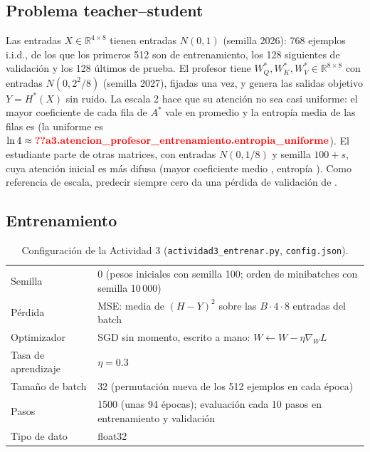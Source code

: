 \documentclass[10pt]{article}
\newcommand{\R}{\mathbb{R}}
\begin{document}
\subsection{Problema teacher--student}
Las entradas $X\in\R^{4\times8}$ tienen entradas $N(0,1)$ (semilla 2026): 768 ejemplos i.i.d., de los
que los primeros 512 son de entrenamiento, los 128 siguientes de validación y los 128 últimos de
prueba. El profesor tiene $W_Q^*, W_K^*, W_V^*\in\R^{8\times8}$ con entradas $N(0, 2^2/8)$ (semilla
2027), fijadas una vez, y genera las salidas objetivo $Y = H^*(X)$ sin ruido. La escala 2 hace que su
atención no sea casi uniforme: el mayor coeficiente de cada fila de $A^*$ vale en promedio
 y la entropía media de las filas es
 (la uniforme es
$\ln4\approx\V{a3.atencion_profesor_entrenamiento.entropia_uniforme}$). El estudiante parte de otras
matrices, con entradas $N(0,1/8)$ y semilla $100+s$, cuya atención inicial es más difusa (mayor
coeficiente medio , entropía
). Como referencia de escala, predecir
siempre cero da una pérdida de validación de .

\subsection{Entrenamiento}
\begin{table}[H]
  \centering\small
  \caption{Configuración de la Actividad 3 (\texttt{actividad3\_entrenar.py}, \texttt{config.json}).}
  \label{tab:config3}
  \begin{tabular}{ll}
    \toprule
    Semilla & 0 (pesos iniciales con semilla 100; orden de minibatches con semilla 10\,000) \\
    Pérdida & MSE: media de $(H-Y)^2$ sobre las $B\cdot4\cdot8$ entradas del batch \\
    Optimizador & SGD sin momento, escrito a mano: $W\leftarrow W-\eta\nabla_W L$ \\
    Tasa de aprendizaje & $\eta = \num{0.3}$ \\
    Tamaño de batch & 32 (permutación nueva de los 512 ejemplos en cada época) \\
    Pasos & 1500 (unas 94 épocas); evaluación cada 10 pasos en entrenamiento y validación \\
    Tipo de dato & float32 \\
    \bottomrule
  \end{tabular}
\end{table}
\end{document}
